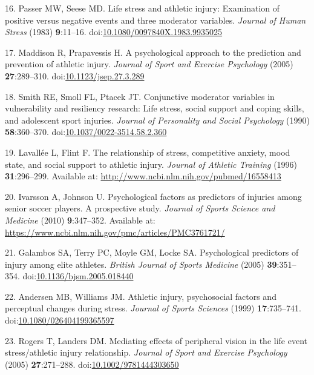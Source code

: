 \documentclass[
  english,
  man]{apa6}
\newenvironment{cslreferences}%
  {}%
  {\par}
\begin{document}
\begin{cslreferences}
\leavevmode\hypertarget{ref-Passer1983a}{}%
16. Passer MW, Seese MD. Life stress and athletic injury: Examination of positive versus negative events and three moderator variables. \emph{Journal of Human Stress} (1983) \textbf{9}:11--16. doi:\href{https://doi.org/10.1080/0097840X.1983.9935025}{10.1080/0097840X.1983.9935025}

\leavevmode\hypertarget{ref-Maddison2005}{}%
17. Maddison R, Prapavessis H. A psychological approach to the prediction and prevention of athletic injury. \emph{Journal of Sport and Exercise Psychology} (2005) \textbf{27}:289--310. doi:\href{https://doi.org/10.1123/jsep.27.3.289}{10.1123/jsep.27.3.289}

\leavevmode\hypertarget{ref-Smith1990}{}%
18. Smith RE, Smoll FL, Ptacek JT. Conjunctive moderator variables in vulnerability and resiliency research: Life stress, social support and coping skills, and adolescent sport injuries. \emph{Journal of Personality and Social Psychology} (1990) \textbf{58}:360--370. doi:\href{https://doi.org/10.1037/0022-3514.58.2.360}{10.1037/0022-3514.58.2.360}

\leavevmode\hypertarget{ref-Lavallee1996}{}%
19. Lavallée L, Flint F. The relationship of stress, competitive anxiety, mood state, and social support to athletic injury. \emph{Journal of Athletic Training} (1996) \textbf{31}:296--299. Available at: \url{http://www.ncbi.nlm.nih.gov/pubmed/16558413}

\leavevmode\hypertarget{ref-Ivarsson2010}{}%
20. Ivarsson A, Johnson U. Psychological factors as predictors of injuries among senior soccer players. A prospective study. \emph{Journal of Sports Science and Medicine} (2010) \textbf{9}:347--352. Available at: \url{https://www.ncbi.nlm.nih.gov/pmc/articles/PMC3761721/}

\leavevmode\hypertarget{ref-Galambos2005}{}%
21. Galambos SA, Terry PC, Moyle GM, Locke SA. Psychological predictors of injury among elite athletes. \emph{British Journal of Sports Medicine} (2005) \textbf{39}:351--354. doi:\href{https://doi.org/10.1136/bjsm.2005.018440}{10.1136/bjsm.2005.018440}

\leavevmode\hypertarget{ref-Andersen1999}{}%
22. Andersen MB, Williams JM. Athletic injury, psychosocial factors and perceptual changes during stress. \emph{Journal of Sports Sciences} (1999) \textbf{17}:735--741. doi:\href{https://doi.org/10.1080/026404199365597}{10.1080/026404199365597}

\leavevmode\hypertarget{ref-Rogers2005}{}%
23. Rogers T, Landers DM. Mediating effects of peripheral vision in the life event stress/athletic injury relationship. \emph{Journal of Sport and Exercise Psychology} (2005) \textbf{27}:271--288. doi:\href{https://doi.org/10.1002/9781444303650}{10.1002/9781444303650}


\end{cslreferences}
\end{document}
